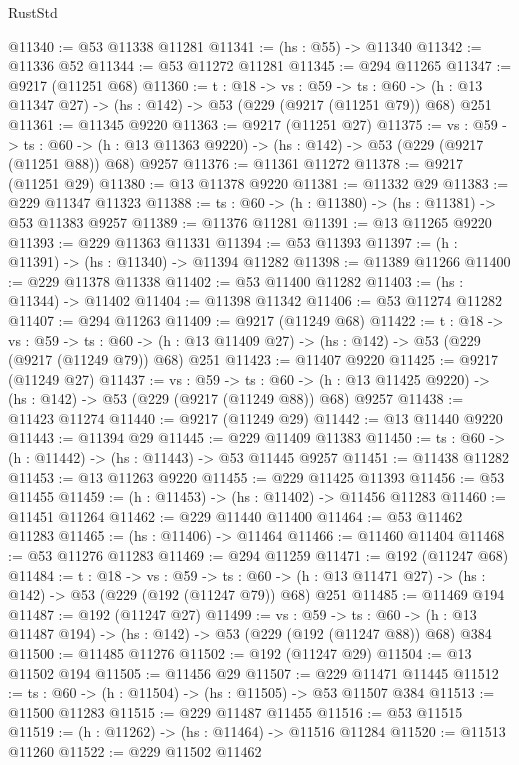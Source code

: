 \begin{lexlean}{RustStd}
\begin{coremodule}
@11340 := @53 @11338 @11281
@11341 := (hs : @55) -> @11340
@11342 := @11336 @52
@11344 := @53 @11272 @11281
@11345 := @294 @11265
@11347 := @9217 (@11251 @68)
@11360 := {t : @18} ->
  {vs : @59} ->
  {ts : @60} -> (h : @13 @11347 @27) -> (hs : @142) -> @53 (@229 (@9217 (@11251 @79)) @68) @251
@11361 := @11345 @9220
@11363 := @9217 (@11251 @27)
@11375 := {vs : @59} ->
  {ts : @60} -> (h : @13 @11363 @9220) -> (hs : @142) -> @53 (@229 (@9217 (@11251 @88)) @68) @9257
@11376 := @11361 @11272
@11378 := @9217 (@11251 @29)
@11380 := @13 @11378 @9220
@11381 := @11332 @29
@11383 := @229 @11347 @11323
@11388 := {ts : @60} -> (h : @11380) -> (hs : @11381) -> @53 @11383 @9257
@11389 := @11376 @11281
@11391 := @13 @11265 @9220
@11393 := @229 @11363 @11331
@11394 := @53 @11393
@11397 := (h : @11391) -> (hs : @11340) -> @11394 @11282
@11398 := @11389 @11266
@11400 := @229 @11378 @11338
@11402 := @53 @11400 @11282
@11403 := (hs : @11344) -> @11402
@11404 := @11398 @11342
@11406 := @53 @11274 @11282
@11407 := @294 @11263
@11409 := @9217 (@11249 @68)
@11422 := {t : @18} ->
  {vs : @59} ->
  {ts : @60} -> (h : @13 @11409 @27) -> (hs : @142) -> @53 (@229 (@9217 (@11249 @79)) @68) @251
@11423 := @11407 @9220
@11425 := @9217 (@11249 @27)
@11437 := {vs : @59} ->
  {ts : @60} -> (h : @13 @11425 @9220) -> (hs : @142) -> @53 (@229 (@9217 (@11249 @88)) @68) @9257
@11438 := @11423 @11274
@11440 := @9217 (@11249 @29)
@11442 := @13 @11440 @9220
@11443 := @11394 @29
@11445 := @229 @11409 @11383
@11450 := {ts : @60} -> (h : @11442) -> (hs : @11443) -> @53 @11445 @9257
@11451 := @11438 @11282
@11453 := @13 @11263 @9220
@11455 := @229 @11425 @11393
@11456 := @53 @11455
@11459 := (h : @11453) -> (hs : @11402) -> @11456 @11283
@11460 := @11451 @11264
@11462 := @229 @11440 @11400
@11464 := @53 @11462 @11283
@11465 := (hs : @11406) -> @11464
@11466 := @11460 @11404
@11468 := @53 @11276 @11283
@11469 := @294 @11259
@11471 := @192 (@11247 @68)
@11484 := {t : @18} ->
  {vs : @59} ->
  {ts : @60} -> (h : @13 @11471 @27) -> (hs : @142) -> @53 (@229 (@192 (@11247 @79)) @68) @251
@11485 := @11469 @194
@11487 := @192 (@11247 @27)
@11499 := {vs : @59} ->
  {ts : @60} -> (h : @13 @11487 @194) -> (hs : @142) -> @53 (@229 (@192 (@11247 @88)) @68) @384
@11500 := @11485 @11276
@11502 := @192 (@11247 @29)
@11504 := @13 @11502 @194
@11505 := @11456 @29
@11507 := @229 @11471 @11445
@11512 := {ts : @60} -> (h : @11504) -> (hs : @11505) -> @53 @11507 @384
@11513 := @11500 @11283
@11515 := @229 @11487 @11455
@11516 := @53 @11515
@11519 := (h : @11262) -> (hs : @11464) -> @11516 @11284
@11520 := @11513 @11260
@11522 := @229 @11502 @11462

\end{coremodule}
\end{lexlean}
